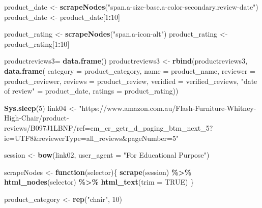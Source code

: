 \documentclass[
]{article}
\newenvironment{Shaded}{\begin{snugshade}}{\end{snugshade}}
\newcommand{\AttributeTok}[1]{\textcolor[rgb]{0.13,0.29,0.53}{#1}}
\newcommand{\ConstantTok}[1]{\textcolor[rgb]{0.56,0.35,0.01}{#1}}
\newcommand{\ControlFlowTok}[1]{\textcolor[rgb]{0.13,0.29,0.53}{\textbf{#1}}}
\newcommand{\DecValTok}[1]{\textcolor[rgb]{0.00,0.00,0.81}{#1}}
\newcommand{\FunctionTok}[1]{\textcolor[rgb]{0.13,0.29,0.53}{\textbf{#1}}}
\newcommand{\NormalTok}[1]{#1}
\newcommand{\OtherTok}[1]{\textcolor[rgb]{0.56,0.35,0.01}{#1}}
\newcommand{\SpecialCharTok}[1]{\textcolor[rgb]{0.81,0.36,0.00}{\textbf{#1}}}
\newcommand{\StringTok}[1]{\textcolor[rgb]{0.31,0.60,0.02}{#1}}
\begin{document}
\begin{Shaded}
\begin{Highlighting}[]
\NormalTok{  product\_date }\OtherTok{\textless{}{-}} \FunctionTok{scrapeNodes}\NormalTok{(}\StringTok{"span.a{-}size{-}base.a{-}color{-}secondary.review{-}date"}\NormalTok{)}
\NormalTok{  product\_date }\OtherTok{\textless{}{-}}\NormalTok{ product\_date[}\DecValTok{1}\SpecialCharTok{:}\DecValTok{10}\NormalTok{]}
  
\NormalTok{  product\_rating }\OtherTok{\textless{}{-}} \FunctionTok{scrapeNodes}\NormalTok{(}\StringTok{"span.a{-}icon{-}alt"}\NormalTok{)}
\NormalTok{  product\_rating }\OtherTok{\textless{}{-}}\NormalTok{ product\_rating[}\DecValTok{1}\SpecialCharTok{:}\DecValTok{10}\NormalTok{]}
  
\NormalTok{  productreviews3}\OtherTok{=} \FunctionTok{data.frame}\NormalTok{()}
\NormalTok{  productreviews3 }\OtherTok{\textless{}{-}} \FunctionTok{rbind}\NormalTok{(productreviews3, }\FunctionTok{data.frame}\NormalTok{(}
                      \AttributeTok{category =}\NormalTok{ product\_category,}
                      \AttributeTok{name =}\NormalTok{ product\_name,}
                      \AttributeTok{reviewer =}\NormalTok{ product\_reviewer,}
                      \AttributeTok{reviews =}\NormalTok{ product\_review,}
                      \AttributeTok{veridied =}\NormalTok{ verified\_reviews,}
                      \StringTok{"date of review"} \OtherTok{=}\NormalTok{ product\_date,}
                      \AttributeTok{ratings =}\NormalTok{ product\_rating))}
  
   \FunctionTok{Sys.sleep}\NormalTok{(}\DecValTok{5}\NormalTok{)}
\NormalTok{link04 }\OtherTok{\textless{}{-}} \StringTok{"https://www.amazon.com.au/Flash{-}Furniture{-}Whitney{-}High{-}Chair/product{-}reviews/B097J1LBNP/ref=cm\_cr\_getr\_d\_paging\_btm\_next\_5?ie=UTF8\&reviewerType=all\_reviews\&pageNumber=5"}


\NormalTok{  session }\OtherTok{\textless{}{-}} \FunctionTok{bow}\NormalTok{(link02,}
               \AttributeTok{user\_agent =} \StringTok{"For Educational Purpose"}\NormalTok{)}

\NormalTok{  scrapeNodes }\OtherTok{\textless{}{-}} \ControlFlowTok{function}\NormalTok{(selector)\{}
    \FunctionTok{scrape}\NormalTok{(session) }\SpecialCharTok{\%\textgreater{}\%}
      \FunctionTok{html\_nodes}\NormalTok{(selector) }\SpecialCharTok{\%\textgreater{}\%}
      \FunctionTok{html\_text}\NormalTok{(}\AttributeTok{trim =} \ConstantTok{TRUE}\NormalTok{)}
\NormalTok{  \}}

\NormalTok{  product\_category }\OtherTok{\textless{}{-}} \FunctionTok{rep}\NormalTok{(}\StringTok{"chair"}\NormalTok{, }\DecValTok{10}\NormalTok{)}


\end{Highlighting}
\end{Shaded}
\end{document}
